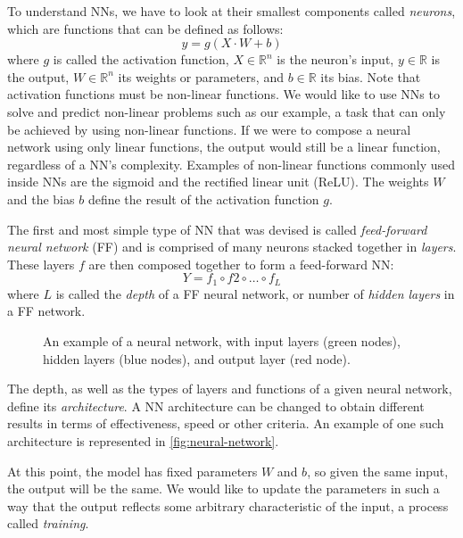 To understand NNs, we have to look at their smallest components called \textit{neurons}, which are functions that can be defined as follows:
\begin{equation}
    y = g(X \cdot W + b)
\end{equation}
where $g$ is called the activation function, $X \in \mathbb{R}^n$ is the neuron's input, $y \in \mathbb{R}$ is the output, $W \in \mathbb{R}^n$ its weights or parameters, and $b \in \mathbb{R}$ its bias.
Note that activation functions must be non-linear functions.
We would like to use NNs to solve and predict non-linear problems such as our example, a task that can only be achieved by using non-linear functions.
If we were to compose a neural network using only linear functions, the output would still be a linear function, regardless of a NN's complexity.
Examples of non-linear functions commonly used inside NNs are the sigmoid and the rectified linear unit (ReLU).
The weights $W$ and the bias $b$ define the result of the activation function $g$.

The first and most simple type of NN that was devised is called \textit{feed-forward neural network} (FF) and is comprised of many neurons stacked together in \textit{layers}.
These layers $f$ are then composed together to form a feed-forward NN:
\begin{equation}
    Y = f_1 \circ f2 \circ \ldots \circ f_L
\end{equation}
where $L$ is called the \textit{depth} of a FF neural network, or number of \textit{hidden layers} in a FF network.

\begin{figure}[h]
    \centering
    \caption{An example of a neural network, with input layers (green nodes), hidden layers (blue nodes), and output layer (red node).}
    \label{fig:neural-network}
    
\end{figure}

The depth, as well as the types of layers and functions of a given neural network, define its \textit{architecture}.
A NN architecture can be changed to obtain different results in terms of effectiveness, speed or other criteria.
An example of one such architecture is represented in \autoref{fig:neural-network}.

At this point, the model has fixed parameters $W$ and $b$, so given the same input, the output will be the same.
We would like to update the parameters in such a way that the output reflects some arbitrary characteristic of the input, a process called \textit{training}.

